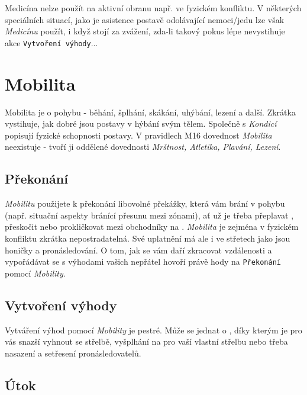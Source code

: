 \documentclass[../main.tex]{subfiles}
\begin{document}
Medicína nelze použít na aktivní obranu např. ve fyzickém konfliktu. V některých speciálních situací, jako je asistence postavě odolávající nemoci/jedu lze však \textit{Medicínu} použít, i když stojí za zvážení, zda-li takový pokus lépe nevystihuje akce \texttt{Vytvoření výhody}...

\section{Mobilita}
\label{sec:mobilita}

Mobilita je o pohybu - běhání, šplhání, skákání, uhýbání, lezení a další. Zkrátka vystihuje, jak dobré jsou postavy v hýbání svým tělem. Společně s \textit{Kondicí} popisují fyzické schopnosti postavy. V pravidlech M16 dovednost \textit{Mobilita} neexistuje - tvoří ji oddělené dovednosti \textit{Mrštnost, Atletika, Plavání, Lezení}. 

\subsection*{Překonání}
\label{subsec:mobilita-prekonani}
\prekonani

\textit{Mobilitu} použijete k překonání libovolné překážky, která vám brání v pohybu (např. situační aspekty bránící přesunu mezi zónami), ať už je třeba přeplavat , přeskočit  nebo prokličkovat mezi obchodníky na . \textit{Mobilita} je zejména v fyzickém konfliktu zkrátka nepostradatelná.
Své uplatnění má ale i ve střetech jako jsou honičky a pronásledování. O tom, jak se vám daří zkracovat vzdálenosti a vypořádávat se s výhodami vašich nepřátel hovoří právě hody na \texttt{Překonání} pomocí \textit{Mobility}.

\subsection*{Vytvoření výhody}
\label{subsec:mobilita-vytvoreni}
\vytvoreni

Vytváření výhod pomocí \textit{Mobility} je pestré. Může se jednat o , díky kterým je pro vás snazší vyhnout se střelbě, vyšplhání na  pro vaší vlastní střelbu nebo třeba nasazení  a setřesení pronásledovatelů.

\subsection*{Útok}
\label{subsec:mobilita-utok}
\utok
\end{document}
